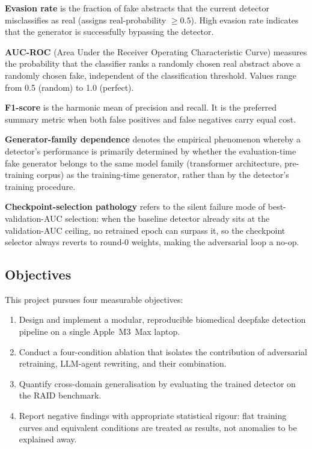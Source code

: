 \documentclass[12pt,a4paper]{article}
\begin{document}
\textbf{Evasion rate} is the fraction of fake abstracts that the current
detector misclassifies as real (assigns real-probability $\geq 0.5$). High
evasion rate indicates that the generator is successfully bypassing the
detector.

\textbf{AUC-ROC} (Area Under the Receiver Operating Characteristic Curve)
measures the probability that the classifier ranks a randomly chosen real
abstract above a randomly chosen fake, independent of the classification
threshold. Values range from 0.5 (random) to 1.0 (perfect).

\textbf{F1-score} is the harmonic mean of precision and recall. It is the
preferred summary metric when both false positives and false negatives
carry equal cost.

\textbf{Generator-family dependence} denotes the empirical phenomenon
whereby a detector's performance is primarily determined by whether the
evaluation-time fake generator belongs to the same model family (transformer
architecture, pre-training corpus) as the training-time generator, rather
than by the detector's training procedure.

\textbf{Checkpoint-selection pathology} refers to the silent failure mode
of best-validation-AUC selection: when the baseline detector already sits
at the validation-AUC ceiling, no retrained epoch can surpass it, so the
checkpoint selector always reverts to round-0 weights, making the adversarial
loop a no-op.

\subsection{Objectives}

This project pursues four measurable objectives:
\begin{enumerate}
    \item Design and implement a modular, reproducible biomedical deepfake
          detection pipeline on a single Apple~M3~Max laptop.
    \item Conduct a four-condition ablation that isolates the contribution
          of adversarial retraining, LLM-agent rewriting, and their
          combination.
    \item Quantify cross-domain generalisation by evaluating the trained
          detector on the RAID benchmark.
    \item Report negative findings with appropriate statistical rigour:
          flat training curves and equivalent conditions are treated as
          results, not anomalies to be explained away.
\end{enumerate}
\end{document}
